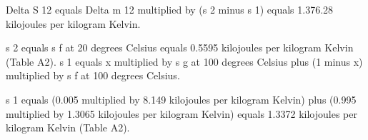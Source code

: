 Delta S 12 equals Delta m 12 multiplied by (s 2 minus s 1) equals 1.376.28 kilojoules per kilogram Kelvin.  

s 2 equals s f at 20 degrees Celsius equals 0.5595 kilojoules per kilogram Kelvin (Table A2).  
s 1 equals x multiplied by s g at 100 degrees Celsius plus (1 minus x) multiplied by s f at 100 degrees Celsius.  

s 1 equals (0.005 multiplied by 8.149 kilojoules per kilogram Kelvin) plus (0.995 multiplied by 1.3065 kilojoules per kilogram Kelvin) equals 1.3372 kilojoules per kilogram Kelvin (Table A2).